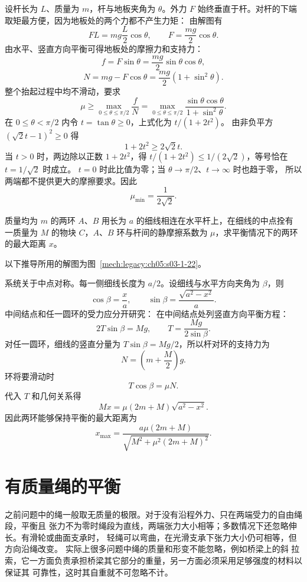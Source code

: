 {\begin{xesolution}
设杆长为 $L$、质量为 $m$，杆与地板夹角为 $\theta$。外力 $F$ 始终垂直于杆。对杆的下端
取矩最方便，因为地板处的两个力都不产生力矩：
\soldiagOneTwentyOne
由解图有
\[
  FL=mg\frac L2\cos\theta,
  \qquad
  F=\frac{mg}{2}\cos\theta.
\]
由水平、竖直方向平衡可得地板处的摩擦力和支持力：
\[
  f=F\sin\theta=\frac{mg}{2}\sin\theta\cos\theta,
\]
\[
  N=mg-F\cos\theta
  =\frac{mg}{2}\left(1+\sin^2\theta\right).
\]
整个抬起过程中均不滑动，要求
\[
  \mu\ge\max_{0\le\theta\le\pi/2}\frac fN
  =\max_{0\le\theta\le\pi/2}
  \frac{\sin\theta\cos\theta}{1+\sin^2\theta}.
\]
在 $0\le\theta<\pi/2$ 内令 $t=\tan\theta\ge0$，上式化为 $t/(1+2t^2)$。
由非负平方 $(\sqrt2t-1)^2\ge0$ 得
\[
 1+2t^2\ge2\sqrt2t.
\]
当 $t>0$ 时，两边除以正数 $1+2t^2$，得
$t/(1+2t^2)\le1/(2\sqrt2)$，等号恰在 $t=1/\sqrt2$ 时成立。
$t=0$ 时此比值为零；当 $\theta\to\pi/2$、$t\to\infty$ 时也趋于零，
所以两端都不提供更大的摩擦要求。因此
\[
  \boxed{\mu_{\min}=\frac{1}{2\sqrt2}}.
\]
\end{xesolution}

\begin{origexamplebox}{}\label{ch05:ex:s03-1-22}
质量均为 $m$ 的两环 $A$、$B$ 用长为 $a$ 的细线相连在水平杆上，在细线的中点拴有
一质量为 $M$ 的物块 $C$，$A$、$B$ 环与杆间的静摩擦系数为 $\mu$，求平衡情况下的两环的最大距离
$x$。
\end{origexamplebox}

\begin{xesolution}
以下推导所用的解图为图~\ref{mech:legacy:ch05:s03-1-22}。

系统关于中点对称。每一侧细线长度为 $a/2$。设细线与水平方向夹角为 $\beta$，则
\[
  \cos\beta=\frac xa,
  \qquad
  \sin\beta=\frac{\sqrt{a^2-x^2}}{a}.
\]
中间结点和任一圆环的受力应分开研究：
\soldiagOneTwentyTwo
在中间结点处列竖直方向平衡方程：
\[
  2T\sin\beta=Mg,
  \qquad
  T=\frac{Mg}{2\sin\beta}.
\]
对任一圆环，细线的竖直分量为 $T\sin\beta=Mg/2$，所以杆对环的支持力为
\[
  N=\left(m+\frac M2\right)g.
\]
环将要滑动时
\[
  T\cos\beta=\mu N.
\]
代入 $T$ 和几何关系得
\[
  Mx=\mu(2m+M)\sqrt{a^2-x^2}.
\]
因此两环能够保持平衡的最大距离为
\[
  \boxed{x_{\max}=
  \frac{a\mu(2m+M)}{\sqrt{M^2+\mu^2(2m+M)^2}}}.
\]
\end{xesolution}

\section{有质量绳的平衡}

之前问题中的绳一般取无质量的极限。对于没有沿程外力、只在两端受力的自由绳段，平衡且
张力不为零时绳段为直线，两端张力大小相等；多数情况下还忽略伸长。有滑轮或曲面支承时，
轻绳可以弯曲，在光滑支承下张力大小仍可相等，但方向沿绳改变。
实际上很多问题中绳的质量和形变不能忽略，例如桥梁上的斜
拉索，它一方面负责承担桥梁其它部分的重量，另一方面必须采用足够强度的材料以保证其
可靠性，这时其自重就不可忽略不计。

}
